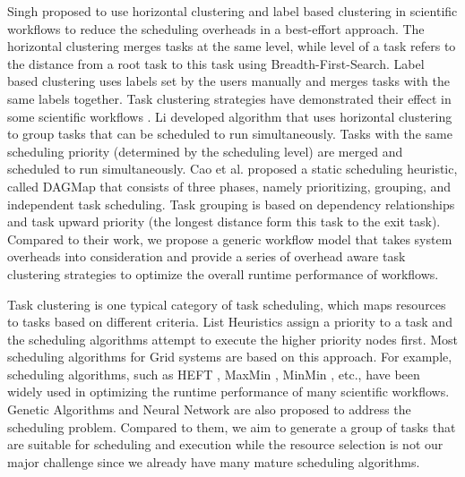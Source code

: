 Singh \cite{Singh2008} proposed to use horizontal clustering and label based clustering in scientific workflows to reduce the scheduling overheads in a best-effort approach. The horizontal clustering merges tasks at the same level, while level of a task refers to the distance from a root task to this task using Breadth-First-Search. Label based clustering uses labels set by the users manually and merges tasks with the same labels together. Task clustering strategies have demonstrated their effect in some scientific workflows \cite{Rynge2012, Maheshwari2012, Hussin2010, Liu2009}.  Li \cite{Li2011}  developed algorithm that uses horizontal clustering to group tasks that can be scheduled to run simultaneously. Tasks with the same scheduling priority (determined by the scheduling level) are merged and scheduled to run simultaneously. Cao et al. \cite{Cao2008} proposed a static scheduling heuristic, called DAGMap that consists of three phases, namely prioritizing, grouping, and independent task scheduling. Task grouping is based on dependency relationships and task upward priority (the longest distance form this task to the exit task). Compared to their work, we propose a generic workflow model that takes system overheads into consideration and provide a series of overhead aware task clustering strategies to optimize the overall runtime performance of workflows. 

Task clustering is one typical category of task scheduling, which maps resources to tasks based on different criteria. List Heuristics assign a priority to a task and the scheduling algorithms attempt to execute the higher priority nodes first. Most scheduling algorithms for Grid systems are based on this approach. For example, scheduling algorithms, such as HEFT \cite{Topcuoglu2002}, MaxMin \cite{Braun2001}, MinMin \cite{Blythe2005}, etc., have been widely used in optimizing the runtime performance of many scientific workflows. Genetic Algorithms \cite{Adamuthe2011} and Neural Network \cite{Babu2012} are also proposed to address the scheduling problem. Compared to them, we aim to generate a group of tasks that are suitable for scheduling and execution while the resource selection is not our major challenge since we already have many mature scheduling algorithms. 





